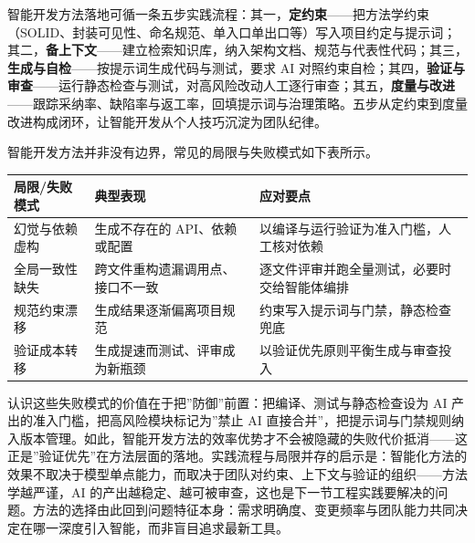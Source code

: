 \documentclass[
]{ctexbook}
\newcounter{none}
\begin{document}
智能开发方法落地可循一条五步实践流程：其一，\textbf{定约束}------把方法学约束（SOLID、封装可见性、命名规范、单入口单出口等）写入项目约定与提示词；其二，\textbf{备上下文}------建立检索知识库，纳入架构文档、规范与代表性代码；其三，\textbf{生成与自检}------按提示词生成代码与测试，要求
AI
对照约束自检；其四，\textbf{验证与审查}------运行静态检查与测试，对高风险改动人工逐行审查；其五，\textbf{度量与改进}------跟踪采纳率、缺陷率与返工率，回填提示词与治理策略。五步从定约束到度量改进构成闭环，让智能开发从个人技巧沉淀为团队纪律。

智能开发方法并非没有边界，常见的局限与失败模式如下表所示。

{\def\LTcaptype{none} %
\begin{longtable}[]{@{}
  >{\raggedright\arraybackslash}p{}
  >{\raggedright\arraybackslash}p{}
  >{\raggedright\arraybackslash}p{}@{}}
\toprule\noalign{}
\begin{minipage}[b]{\linewidth}\raggedright
局限/失败模式
\end{minipage} & \begin{minipage}[b]{\linewidth}\raggedright
典型表现
\end{minipage} & \begin{minipage}[b]{\linewidth}\raggedright
应对要点
\end{minipage} \\
\midrule\noalign{}
\endhead
\bottomrule\noalign{}
\endlastfoot
幻觉与依赖虚构 & 生成不存在的 API、依赖或配置 &
以编译与运行验证为准入门槛，人工核对依赖 \\
全局一致性缺失 & 跨文件重构遗漏调用点、接口不一致 &
逐文件评审并跑全量测试，必要时交给智能体编排 \\
规范约束漂移 & 生成结果逐渐偏离项目规范 &
约束写入提示词与门禁，静态检查兜底 \\
验证成本转移 & 生成提速而测试、评审成为新瓶颈 &
以验证优先原则平衡生成与审查投入 \\
\end{longtable}
}

认识这些失败模式的价值在于把''防御''前置：把编译、测试与静态检查设为 AI
产出的准入门槛，把高风险模块标记为''禁止 AI
直接合并''，把提示词与门禁规则纳入版本管理。如此，智能开发方法的效率优势才不会被隐藏的失败代价抵消------这正是''验证优先''在方法层面的落地。实践流程与局限并存的启示是：智能化方法的效果不取决于模型单点能力，而取决于团队对约束、上下文与验证的组织------方法学越严谨，AI
的产出越稳定、越可被审查，这也是下一节工程实践要解决的问题。方法的选择由此回到问题特征本身：需求明确度、变更频率与团队能力共同决定在哪一深度引入智能，而非盲目追求最新工具。
\end{document}
